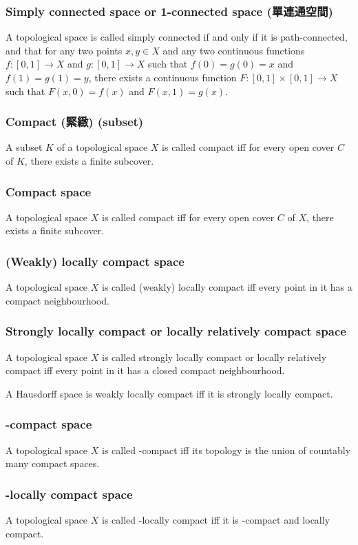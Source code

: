 \documentclass[a4paper,12pt]{article}
\begin{document}
\subsubsection{Simply connected space or 1-connected space (單連通空間)}
A topological space is called simply connected if and only if it is path-connected, and that for any two points $x,y\in X$ and any two continuous functions $f\colon[0,1]\to X$ and $g\colon[0,1]\to X$ such that $f(0)=g(0)=x$ and $f(1)=g(1)=y$, there exists a continuous function $F\colon[0,1]\times[0,1]\to X$ such that $F(x,0)=f(x)$ and $F(x,1)=g(x)$.
\subsubsection{Compact (緊緻) (subset)}
A subset $K$ of a topological space $X$ is called compact iff for every open cover $C$ of $K$, there exists a finite subcover.
\subsubsection{Compact space}
A topological space $X$ is called compact iff for every open cover $C$ of $X$, there exists a finite subcover.
\subsubsection{(Weakly) locally compact space}
A topological space $X$ is called (weakly) locally compact iff every point in it has a compact neighbourhood.
\subsubsection{Strongly locally compact or locally relatively compact space}
A topological space $X$ is called strongly locally compact or locally relatively compact iff every point in it has a closed compact neighbourhood.

A Hausdorff space is weakly locally compact iff it is strongly locally compact.
\subsubsection{\text{\textsigma}-compact space}
A topological space $X$ is called \text{\textsigma}-compact iff its topology is the union of countably many compact spaces.
\subsubsection{\text{\textsigma}-locally compact space}
A topological space $X$ is called \text{\textsigma}-locally compact iff it is \text{\textsigma}-compact and locally compact.
\end{document}
